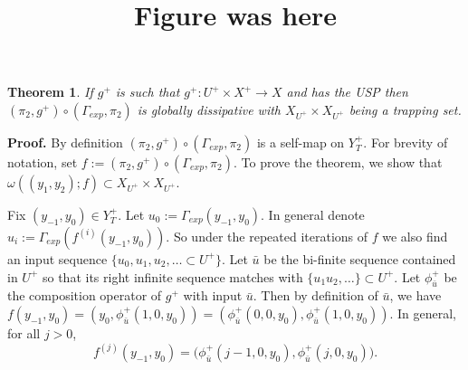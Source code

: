 \documentclass[12 pt]{article}
\newtheorem{Theorem}{Theorem}[]
\begin{document}


\title{Figure was here}







\begin{Theorem} \label{Thm_GD}
If $g^+$ is such that $g^+ : U^+ \times X^+ \to X$ and has the USP then $(\pi_2,g^+) \circ (\Gamma_{exp},\pi_2)$ is globally dissipative with $X_{U^{+}} \times X_{U^{+}}$ being a trapping set. 
\end{Theorem}

{\bf Proof. } By definition $(\pi_2,g^+) \circ (\Gamma_{exp},\pi_2)$ is a self-map on $Y_T^+$. For brevity of notation, set $f := (\pi_2,g^+) \circ (\Gamma_{exp},\pi_2)$. To prove the theorem, we  show that  $\omega((y_1,y_2);f) \subset X_{U^{+}} \times X_{U^{+}}$. 


Fix $(y_{-1},y_0) \in Y_T^+$. Let $u_0 := \Gamma_{exp}(y_{-1},y_{0})$. In general denote $u_i := \Gamma_{exp}(f^{(i)}(y_{-1},y_0))$. 
 So under the repeated iterations of $f$ we also find an input sequence $\{u_0,u_1,u_2,\ldots \subset  U^+\}$. Let $\bar{u}$ be the bi-finite sequence contained in $U^+$ so that its right infinite sequence matches with $\{u_1u_2,\ldots\} \subset  U^+$. Let $\phi_{\bar{u}}^+$ be the composition operator of $g^+$ with input ${\bar{u}}$. Then 
 by definition of $\bar{u}$, we have $f(y_{-1},y_{0}) =  (y_0,\phi_{\bar{u}}^+(1,0,y_{0})) = (\phi_{\bar{u}}^+(0,0,y_{0}),\phi_{\bar{u}}^+(1,0,y_{0}))$.
 In general, for all $j>0$,  $$f^{(j)}(y_{-1},y_{0}) =   
 \Big(\phi_{\bar{u}}^+(j-1,0,y_0), \phi_{\bar{u}}^+(j,0,y_0)\Big).$$
 
\end{document}
